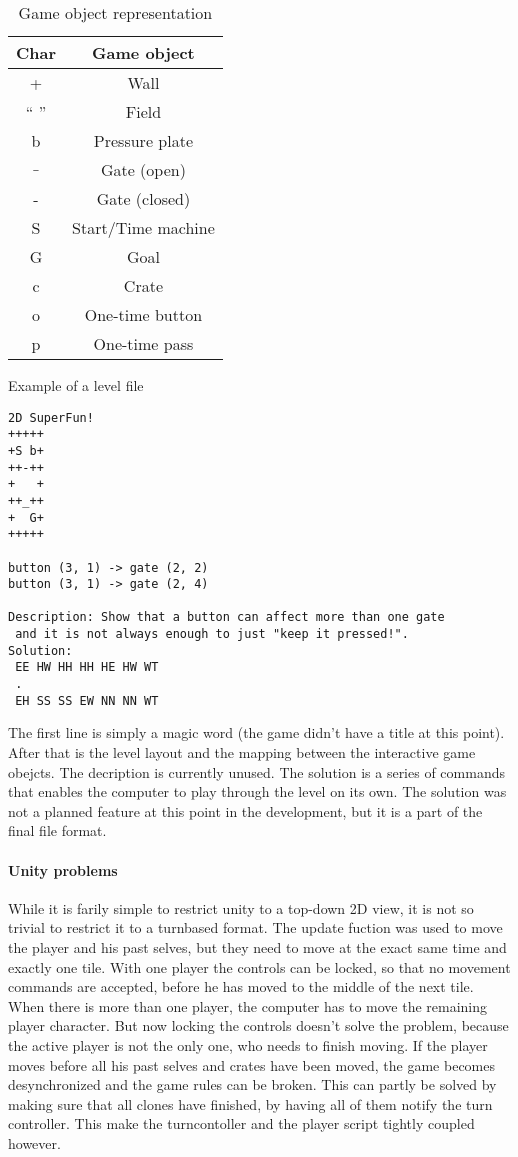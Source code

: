 \begin{table}
\caption{Game object representation}
\begin{tabular}{|c|c|}
\hline
Char & Game object\\
\hline
+ & Wall\\
`` '' & Field\\
b & Pressure plate\\
$\_$ & Gate (open)\\
- & Gate (closed)\\
S & Start/Time machine\\
G & Goal\\
c & Crate\\
o & One-time button\\
p & One-time pass\\
\hline
\end{tabular}
\end{table}

Example of a level file

\begin{verbatim}
2D SuperFun!
+++++
+S b+
++-++
+   +
++_++
+  G+
+++++

button (3, 1) -> gate (2, 2)
button (3, 1) -> gate (2, 4)

Description: Show that a button can affect more than one gate
 and it is not always enough to just "keep it pressed!".
Solution:
 EE HW HH HH HE HW WT
 .
 EH SS SS EW NN NN WT
\end{verbatim}

The first line is simply a magic word (the game didn't have a title at this point). After that is the level layout and the mapping between the interactive game obejcts. The decription is currently unused. The solution is a series of commands that enables the computer to play through the level on its own. The solution was not a planned feature at this point in the development, but it is a part of the final file format.

\paragraph{Unity problems}
While it is farily simple to restrict unity to a top-down 2D view, it
is not so trivial to restrict it to a turnbased format. The update
fuction was used to move the player and his past selves, but they need
to move at the exact same time and exactly one tile. With one player
the controls can be locked, so that no movement commands are accepted,
before he has moved to the middle of the next tile. When there is more
than one player, the computer has to move the remaining player
character. But now locking the controls doesn't solve the problem,
because the active player is not the only one, who needs to finish
moving. If the player moves before all his past selves and crates have
been moved, the game becomes desynchronized and the game rules can be
broken. This can partly be solved by making sure that all clones have
finished, by having all of them notify the turn controller. This make
the turncontoller and the player script tightly coupled however.
